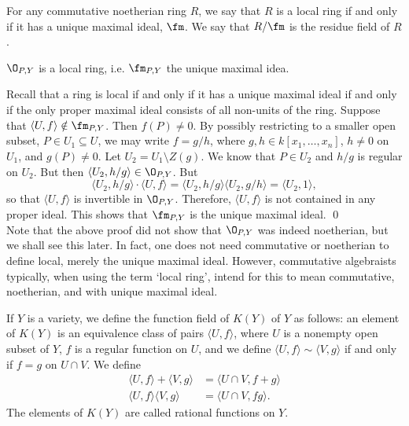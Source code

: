 \begin{rem}
For any commutative noetherian ring $R$, we say that $R$ is a local ring if and only if it has a unique maximal ideal, $\fm$. We say that $R/\fm$ is the residue field of $R$. 
\end{rem}


\begin{prop}
$\O_{P,Y}$ is a local ring, i.e. $\fm_{P,Y}$ the unique maximal idea. 
\end{prop}

\pf Recall that a ring is local if and only if it has a unique maximal ideal if and only if the only proper maximal ideal consists of all non-units of the ring. Suppose that $\langle U,f \rangle \notin \fm_{P,Y}$. Then $f(P) \neq 0$. By possibly restricting to a smaller open subset, $P \in U_1 \subseteq U$, we may write $f= g/h$, where $g,h \in k[x_1,\ldots,x_n]$, $h \neq 0$ on $U_1$, and $g(P) \neq 0$. Let $U_2= U_1 \setminus Z(g)$. We know that $P \in U_2$ and $h/g$ is regular on $U_2$. But then $\langle U_2, h/g \rangle \in \O_{P,Y}$. But
	\[
	\langle U_2, h/g \rangle \cdot \langle U,f \rangle= \langle U_2, h/g \rangle \langle U_2, g/h \rangle= \langle U_2,1 \rangle,
	\]
so that $\langle U,f \rangle$ is invertible in $\O_{P,Y}$. Therefore, $\langle U,f \rangle$ is not contained in any proper ideal. This shows that $\fm_{P,Y}$ is the unique maximal ideal. \qed \\


Note that the above proof did not show that $\O_{P,Y}$ was indeed noetherian, but we shall see this later. In fact, one does not need commutative or noetherian to define local, merely the unique maximal ideal. However, commutative algebraists typically, when using the term `local ring', intend for this to mean commutative, noetherian, and with unique maximal ideal.


\begin{dfn}
If $Y$ is a variety, we define the function field of $K(Y)$ of $Y$ as follows: an element of $K(Y)$ is an equivalence class of pairs $\langle U,f \rangle$, where $U$ is a nonempty open subset of $Y$, $f$ is a regular function on $U$, and we define $\langle U,f \rangle \sim \langle V,g \rangle$ if and only if $f=g$ on $U \cap V$. We define
	\[
	\begin{split}
	\langle U,f \rangle + \langle V,g \rangle&= \langle U \cap V, f+g \rangle \\
	\langle U, f \rangle \langle V,g \rangle&= \langle U \cap V, fg \rangle.
	\end{split}
	\]
The elements of $K(Y)$ are called rational functions on $Y$.
\end{dfn}


